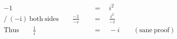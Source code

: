 \begin{align*}
-1\quad&\,=\quad i^2\\
\mathrm{/~(-i)~both~sides}\qquad\frac{-1}{-i}\quad&\,=\quad\frac{i^2}{-i}\\
\mathrm{Thus}\qquad\frac{1}{i}\quad&\,=\quad-i\qquad\mathrm{(sane~proof)}
\end{align*}
